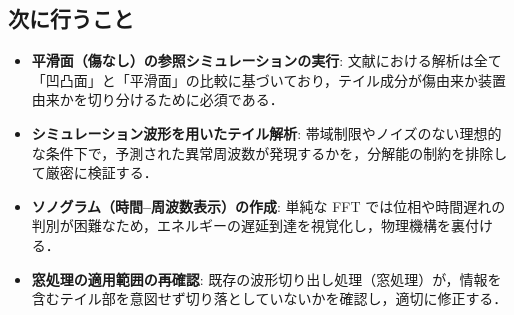 \documentclass{jarticle}
\begin{document}
\subsection{次に行うこと}
\begin{itemize}
 \item \textbf{平滑面（傷なし）の参照シミュレーションの実行}: 文献における解析は全て「凹凸面」と「平滑面」の比較に基づいており，テイル成分が傷由来か装置由来かを切り分けるために必須である．
 \item \textbf{シミュレーション波形を用いたテイル解析}: 帯域制限やノイズのない理想的な条件下で，予測された異常周波数が発現するかを，分解能の制約を排除して厳密に検証する．
 \item \textbf{ソノグラム（時間--周波数表示）の作成}: 単純な FFT では位相や時間遅れの判別が困難なため，エネルギーの遅延到達を視覚化し，物理機構を裏付ける．
 \item \textbf{窓処理の適用範囲の再確認}: 既存の波形切り出し処理（窓処理）が，情報を含むテイル部を意図せず切り落としていないかを確認し，適切に修正する．
\end{itemize}

%
\end{document}
